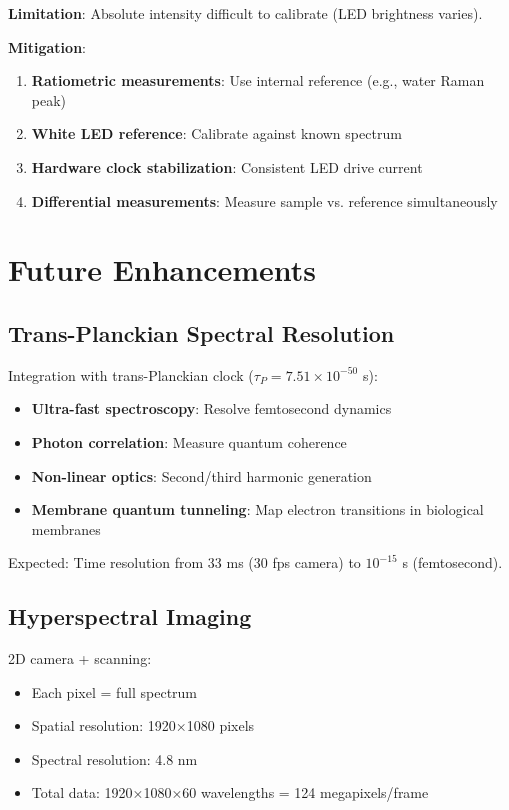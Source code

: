 \documentclass[12pt,a4paper]{article}
\begin{document}
\textbf{Limitation}: Absolute intensity difficult to calibrate (LED brightness varies).

\textbf{Mitigation}:
\begin{enumerate}
\item \textbf{Ratiometric measurements}: Use internal reference (e.g., water Raman peak)
\item \textbf{White LED reference}: Calibrate against known spectrum
\item \textbf{Hardware clock stabilization}: Consistent LED drive current
\item \textbf{Differential measurements}: Measure sample vs. reference simultaneously
\end{enumerate}

\section{Future Enhancements}

\subsection{Trans-Planckian Spectral Resolution}

Integration with trans-Planckian clock ($\tau_P = 7.51 \times 10^{-50}$ s):

\begin{itemize}
\item \textbf{Ultra-fast spectroscopy}: Resolve femtosecond dynamics
\item \textbf{Photon correlation}: Measure quantum coherence
\item \textbf{Non-linear optics}: Second/third harmonic generation
\item \textbf{Membrane quantum tunneling}: Map electron transitions in biological membranes
\end{itemize}

Expected: Time resolution from 33 ms (30 fps camera) to $10^{-15}$ s (femtosecond).

\subsection{Hyperspectral Imaging}

2D camera + scanning:
\begin{itemize}
\item Each pixel = full spectrum
\item Spatial resolution: 1920×1080 pixels
\item Spectral resolution: 4.8 nm
\item Total data: 1920×1080×60 wavelengths = 124 megapixels/frame
\end{itemize}
\end{document}
